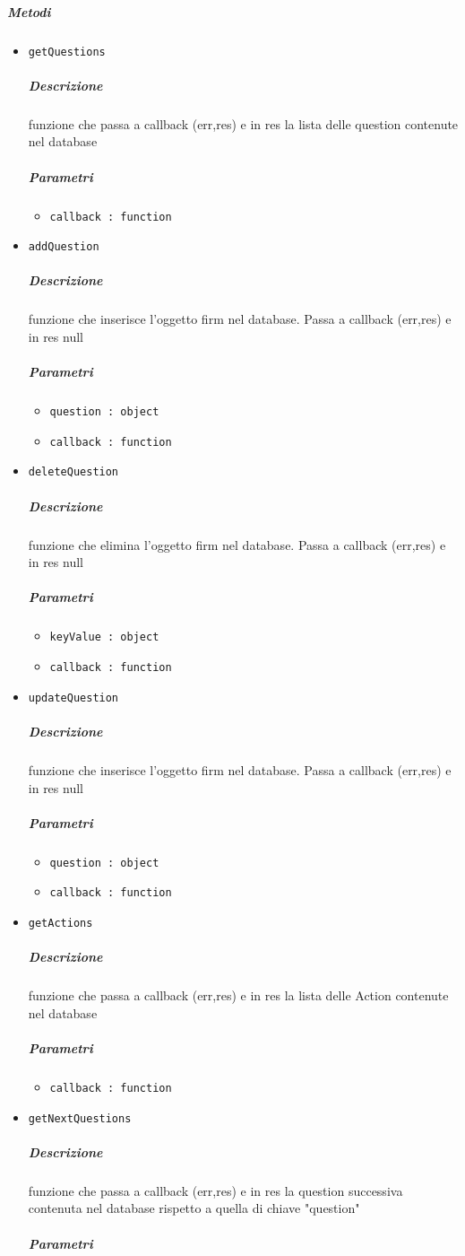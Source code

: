 \documentclass[../ManualeSviluppatore_v1.0.0.tex]{subfiles}
\begin{document}
\subparagraph{Metodi}\begin{itemize}
\item \texttt{getQuestions}
\subparagraph{Descrizione}funzione che passa a callback (err,res) e in res la lista delle question contenute nel database
\subparagraph{Parametri}
\begin{itemize}
	\item \texttt{callback : function}
\end{itemize}
\item \texttt{addQuestion}
\subparagraph{Descrizione}funzione che inserisce l'oggetto firm nel database. Passa a callback (err,res) e in res null
\subparagraph{Parametri}
\begin{itemize}
	\item \texttt{question : object}
	\item \texttt{callback : function}
\end{itemize}
\item \texttt{deleteQuestion}
\subparagraph{Descrizione}funzione che elimina l'oggetto firm nel database. Passa a callback (err,res) e in res null
\subparagraph{Parametri}
\begin{itemize}
	\item \texttt{keyValue : object}
	\item \texttt{callback : function}
\end{itemize}
\item \texttt{updateQuestion}
\subparagraph{Descrizione}funzione che inserisce l'oggetto firm nel database. Passa a callback (err,res) e in res null
\subparagraph{Parametri}
\begin{itemize}
	\item \texttt{question : object}
	\item \texttt{callback : function}
\end{itemize}
\item \texttt{getActions}
\subparagraph{Descrizione}funzione che passa a callback (err,res) e in res la lista delle Action contenute nel database
\subparagraph{Parametri}
\begin{itemize}
	\item \texttt{callback : function}
\end{itemize}
\item \texttt{getNextQuestions}
\subparagraph{Descrizione}funzione che passa a callback (err,res) e in res la  question successiva contenuta nel database rispetto a quella di chiave "question"
\subparagraph{Parametri}
\begin{itemize}

\end{itemize}
\end{itemize}
\end{document}
